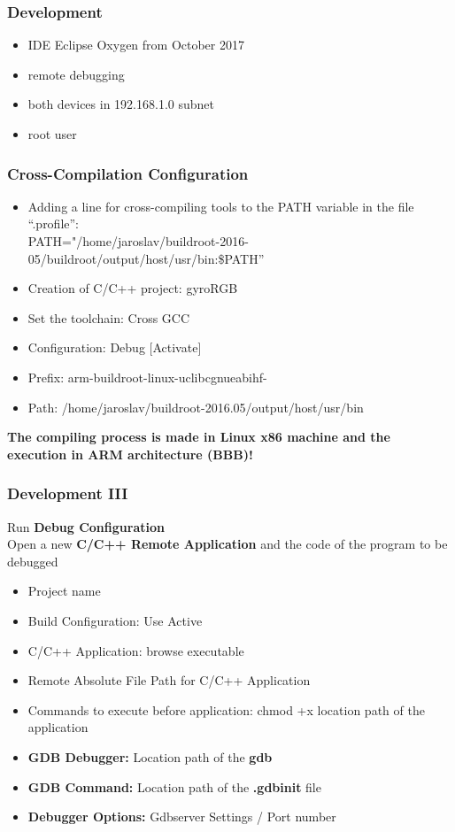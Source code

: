 \documentclass{beamer}
\begin{document}
\begin{frame}
	\frametitle{Development}
		\begin{itemize}
			\item IDE Eclipse Oxygen from October 2017
			\item remote debugging 
			\item both devices in 192.168.1.0 subnet
			\item root user
		\end{itemize}
\end{frame}
\begin{frame}
\frametitle{Cross-Compilation Configuration}
\begin{itemize}
	\item Adding a line for cross-compiling tools to the PATH variable in the file “.profile”:\\
	PATH="/home/jaroslav/buildroot-2016-05/buildroot/output/host/usr/bin:\$PATH”
	\item Creation of C/C++ project: gyroRGB 
	\item Set the toolchain: Cross GCC
	\item Configuration: Debug [Activate]
	\item Prefix: arm-buildroot-linux-uclibcgnueabihf-
	\item Path: /home/jaroslav/buildroot-2016.05/output/host/usr/bin
\end{itemize}
\textbf{The compiling process is made in Linux x86 machine and the execution in ARM architecture (BBB)!}
\end{frame}
\begin{frame}
\frametitle{Development III}
Run \textbf{Debug Configuration} \\
Open a new \textbf{C/C++ Remote Application} and the code of the program to be debugged
\begin{itemize}
	\item Project name
	\item Build Configuration: Use Active 
	\item C/C++ Application: browse  executable
	\item Remote Absolute File Path for C/C++ Application
	\item Commands to execute before application: chmod +x location path of the application
	\item \textbf{GDB Debugger:} Location path of the \textbf{gdb}
	\item \textbf{GDB Command:} Location path of the \textbf{.gdbinit} file
	\item \textbf{Debugger Options:} Gdbserver Settings / Port number
\end{itemize}
\end{frame}
\end{document}
